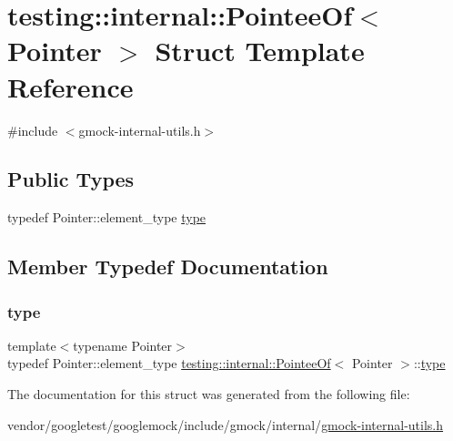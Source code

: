\hypertarget{structtesting_1_1internal_1_1_pointee_of}{}\section{testing\+:\+:internal\+:\+:Pointee\+Of$<$ Pointer $>$ Struct Template Reference}
\label{structtesting_1_1internal_1_1_pointee_of}


{\ttfamily \#include $<$gmock-\/internal-\/utils.\+h$>$}

\subsection*{Public Types}
\begin{DoxyCompactItemize}
\item 
typedef Pointer\+::element\+\_\+type \hyperlink{structtesting_1_1internal_1_1_pointee_of_aca4d92c8f978e47a8695e82cffc11837}{type}
\end{DoxyCompactItemize}


\subsection{Member Typedef Documentation}
\mbox{\label{structtesting_1_1internal_1_1_pointee_of_aca4d92c8f978e47a8695e82cffc11837}} 
\subsubsection{\texorpdfstring{type}{type}}
{\footnotesize\ttfamily template$<$typename Pointer$>$ \\
typedef Pointer\+::element\+\_\+type \hyperlink{structtesting_1_1internal_1_1_pointee_of}{testing\+::internal\+::\+Pointee\+Of}$<$ Pointer $>$\+::\hyperlink{structtesting_1_1internal_1_1_pointee_of_aca4d92c8f978e47a8695e82cffc11837}{type}}



The documentation for this struct was generated from the following file\+:\begin{DoxyCompactItemize}
\item 
vendor/googletest/googlemock/include/gmock/internal/\hyperlink{gmock-internal-utils_8h}{gmock-\/internal-\/utils.\+h}\end{DoxyCompactItemize}
